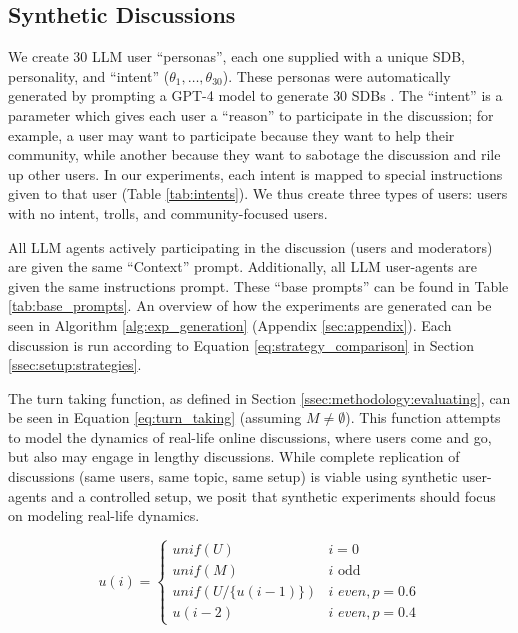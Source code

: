 \subsection{Synthetic Discussions}
\label{ssec:experimental:discussions}

We create 30 \ac{LLM} user “personas”,  each one supplied with a unique \ac{SDB}, personality, and “intent” ($\theta_1, \ldots, \theta_{30}$). These personas were automatically generated by prompting a GPT-4 model to generate $30$ \acp{SDB} \cite{openai2024gpt4technicalreport}. The “intent” is a parameter which gives each user a “reason” to participate in the discussion; for example, a user may want to participate because they want to help their community, while another because they want to sabotage the discussion and rile up other users. In our experiments, each intent is mapped to special instructions given to that user (Table \ref{tab:intents}). We thus create three types of users: users with no intent, trolls, and community-focused users.

All \ac{LLM} agents actively participating in the discussion (users and moderators) are given the same “Context” prompt. Additionally, all \ac{LLM} user-agents are given the same instructions prompt. These “base prompts” can be found in Table \ref{tab:base_prompts}. An overview of how the experiments are generated can be seen in Algorithm \ref{alg:exp_generation} (Appendix \ref{sec:appendix}). Each discussion is run according to Equation \ref{eq:strategy_comparison} in Section \ref{ssec:setup:strategies}. 

The turn taking function, as defined in Section \ref{ssec:methodology:evaluating}, can be seen in Equation \ref{eq:turn_taking} (assuming $M \neq \emptyset$). This function attempts to model the dynamics of real-life online discussions, where users come and go, but also may engage in lengthy discussions. While complete replication of discussions (same users, same topic, same setup) is viable using synthetic user-agents and a controlled setup, we posit that synthetic experiments should focus on modeling real-life dynamics.

\small
\begin{equation}
\label{eq:turn_taking}
    u(i) = \left\{
\begin{array}{ll}
\textit{unif}(U) & i=0\\
    \textit{unif}(M) & i \text{ odd}\\
    \textit{unif}(U/\{u(i-1)\}) & i \textit{ even}, p=0.6 \\
    u(i-2) & i \textit{ even}, p=0.4 
\end{array} 
\right.
\end{equation}
\normalsize

